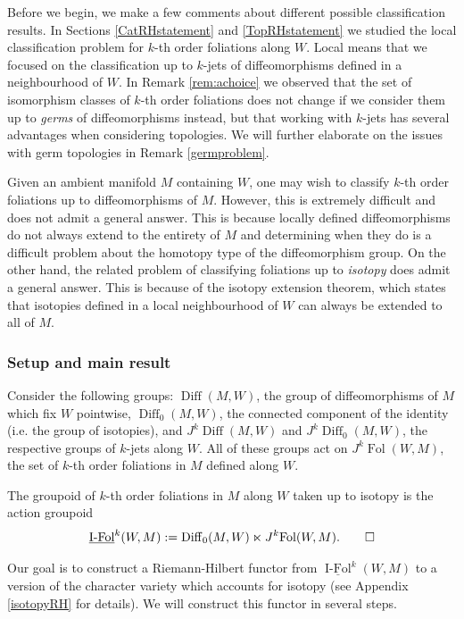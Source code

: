 \documentclass[10pt]{amsart}
\newcommand{\Diff}{{\operatorname{Diff}}}
\newcommand{\FolObj}{{\operatorname{Fol}}}
\newcommand{\IsoCat}{\underline{\operatorname{I-Fol}}}
\numberwithin{theoremalpha}{section}
\numberwithin{equation}{section}
\numberwithin{definition}{section}
\numberwithin{theorem}{section}
\numberwithin{proposition}{section}
\numberwithin{lemma}{section}
\numberwithin{example}{section}
\numberwithin{remark}{section}
\numberwithin{corollary}{section}
\numberwithin{question}{section}
\numberwithin{problem}{section}
\numberwithin{assumption}{section}
\theoremstyle{named}
\numberwithin{equation}{section}
\begin{document}
Before we begin, we make a few comments about different possible classification results. In Sections \ref{CatRHstatement} and \ref{TopRHstatement}  we studied the local classification problem for $k$-th order foliations along $W$. Local means that we focused on the classification up to $k$-jets of diffeomorphisms defined in a neighbourhood of $W$. In Remark \ref{rem:achoice} we observed that the set of isomorphism classes of $k$-th order foliations does not change if we consider them up to \emph{germs} of diffeomorphisms instead, but that working with $k$-jets has several advantages when considering topologies. We will further elaborate on the issues with germ topologies in Remark \ref{germproblem}. 

Given an ambient manifold $M$ containing $W$, one may wish to classify $k$-th order foliations up to diffeomorphisms of $M$. However, this is extremely difficult and does not admit a general answer. This is because locally defined diffeomorphisms do not always extend to the entirety of $M$ and determining when they do is a difficult problem about the homotopy type of the diffeomorphism group. On the other hand, the related problem of classifying foliations up to \emph{isotopy} does admit a general answer. This is because of the isotopy extension theorem, which states that isotopies defined in a local neighbourhood of $W$ can always be extended to all of $M$. 

\subsubsection{Setup and main result}
Consider the following groups: $\Diff(M,W)$, the group of diffeomorphisms of $M$ which fix $W$ pointwise, $\Diff_0(M, W)$, the connected component of the identity (i.e. the group of isotopies), and $J^k\Diff(M,W)$ and $J^k\Diff_0(M, W)$, the respective groups of $k$-jets along $W$. All of these groups act on  $J^k\FolObj(W,M)$, the set of $k$-th order foliations in $M$ defined along $W$.

\begin{definition}
The groupoid of $k$-th order foliations in $M$ along $W$ taken up to isotopy is the action groupoid
\[ \IsoCat^{k}(W,M) := \Diff_0(M, W) \ltimes J^k\FolObj(W,M). \qedhere \] 
\end{definition}

Our goal is to construct a Riemann-Hilbert functor from $\IsoCat^{k}(W,M)$ to a version of the character variety which accounts for isotopy (see Appendix \ref{isotopyRH} for details). We will construct this functor in several steps. 
\end{document}
